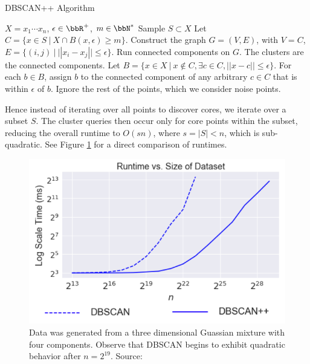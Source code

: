   \begin{algorithm}[H]
    \caption{DBSCAN++ Algorithm}
    \label{dbscan++ alg}
    \begin{algorithmic}[1]
      \renewcommand\algorithmicrequire{\textbf{input}}
      \REQUIRE $X = {x_1\cdots x_n}$, $\epsilon \in \bbR^+$, $m \in \bbN^*$
      \STATE Sample $S \subset X$
      \STATE Let $C=\{x \in S \ | \ X \cap B(x, \epsilon) \geq m\}$.
      \STATE Construct the graph $G=(V,E)$, with $V=C$, $E=\{(i,j) \ | \ ||x_i-x_j|| \leq \epsilon\}$.
      \STATE Run connected components on $G$. The clusters are the connected components.
      \STATE Let $B=\{x \in X \ | \ x \notin C, \exists c \in C, ||x-c|| \leq \epsilon\}$.
      For each $b \in B$, assign $b$ to the connected component of any arbitrary $c \in C$
      that is within $\epsilon$ of $b$.
      \STATE Ignore the rest of the points, which we consider noise points.
    \end{algorithmic}
  \end{algorithm}
  
Hence instead of iterating over all points to discover cores, we iterate over a subset $S$. The cluster queries then occur only for core points within the subset, reducing the overall runtime to $O(sn)$, where $s = |S| < n$, which is sub-quadratic. See Figure \ref{fig:runtime} for a direct comparison of runtimes.

\begin{figure}[h]
\centering
\includegraphics[scale=0.48]{chapter_2/files/dbscan_plus_runtimes.png}
\caption{Data was generated from a three dimensional Guassian mixture with four components. Observe that DBSCAN begins to exhibit quadratic behavior after $n=2^19$. Source: \cite{dbscanpp}}
\label{fig:runtime}
\end{figure}

